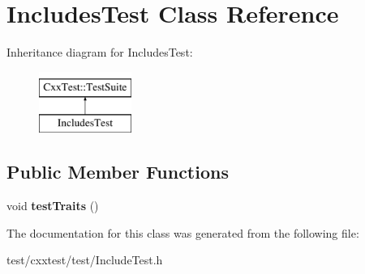 \hypertarget{classIncludesTest}{\section{Includes\-Test Class Reference}
\label{classIncludesTest}
}
Inheritance diagram for Includes\-Test\-:\begin{figure}[H]
\begin{center}
\leavevmode
\includegraphics[height=2.000000cm]{classIncludesTest}
\end{center}
\end{figure}
\subsection*{Public Member Functions}
\begin{DoxyCompactItemize}
\item 
\hypertarget{classIncludesTest_a58ce77af14c5d3fd52e01c28b7eb8536}{void {\bfseries test\-Traits} ()}\label{classIncludesTest_a58ce77af14c5d3fd52e01c28b7eb8536}

\end{DoxyCompactItemize}


The documentation for this class was generated from the following file\-:\begin{DoxyCompactItemize}
\item 
test/cxxtest/test/Include\-Test.\-h\end{DoxyCompactItemize}
